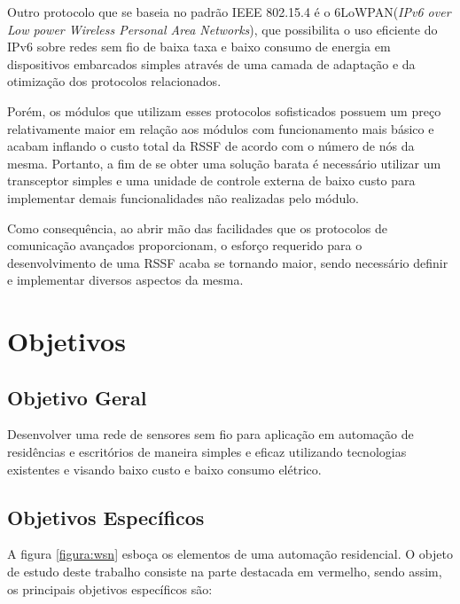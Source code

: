 \documentclass[
    12pt,               %
    a4paper,            %
    english,            %
    brazil,             %
    ]{article}
\begin{document}
Outro protocolo que se baseia no padrão IEEE 802.15.4 é o 6LoWPAN(\textit{IPv6 over Low power Wireless Personal Area Networks}),
que possibilita o uso eficiente do IPv6 sobre redes sem fio de baixa taxa e baixo consumo de energia em dispositivos embarcados
simples através de uma camada de adaptação e da otimização dos protocolos relacionados. \cite{shelby_bormann2009}

Porém, os módulos que utilizam esses protocolos sofisticados possuem um preço relativamente maior em relação aos módulos com
funcionamento mais básico e acabam inflando o custo total da RSSF de acordo com o número de nós da mesma. Portanto, a fim de se
obter uma solução barata é necessário utilizar um transceptor simples e uma unidade de controle externa de baixo custo para
implementar demais funcionalidades não realizadas pelo módulo.

Como consequência, ao abrir mão das facilidades que os protocolos de comunicação avançados proporcionam, o esforço requerido para
o desenvolvimento de uma RSSF acaba se tornando maior, sendo necessário definir e implementar diversos aspectos da mesma.

\section{Objetivos}


	\subsection{Objetivo Geral}

	Desenvolver uma rede de sensores sem fio para aplicação em automação de residências e escritórios de maneira simples e eficaz
	utilizando tecnologias existentes e visando baixo custo e baixo consumo elétrico.

	\subsection{Objetivos Específicos}

	A figura \ref{figura:wsn} esboça os elementos de uma automação residencial. O objeto de estudo deste trabalho consiste na
	parte destacada em vermelho, sendo assim, os principais objetivos específicos são:
\end{document}
